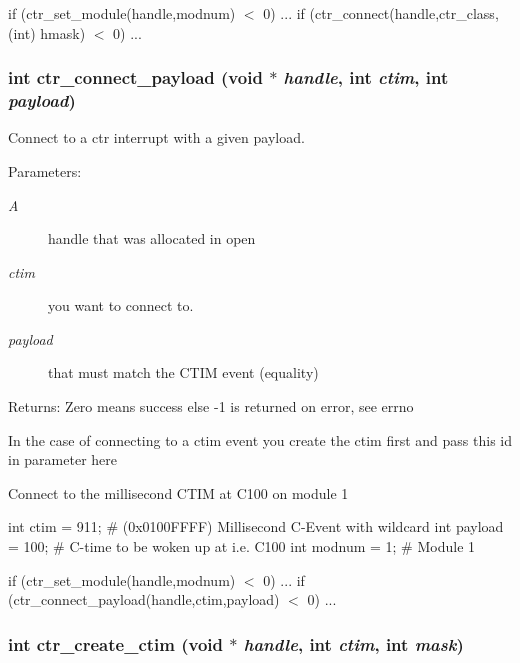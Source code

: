if (ctr\_\-set\_\-module(handle,modnum) $<$ 0) ... if (ctr\_\-connect(handle,ctr\_\-class,(int) hmask) $<$ 0) ... 
\subsubsection{\setlength{\rightskip}{0pt plus 5cm}int ctr\_\-connect\_\-payload (void $\ast$ {\em handle}, int {\em ctim}, int {\em payload})}\label{libctr_8doxygen_b11720b007c8cfd832a098c23f6c9fea}


Connect to a ctr interrupt with a given payload. 

\begin{Desc}
\item[Parameters:]
\begin{description}
\item[{\em A}]handle that was allocated in open \item[{\em ctim}]you want to connect to. \item[{\em payload}]that must match the CTIM event (equality) \end{description}
\end{Desc}
\begin{Desc}
\item[Returns:]Zero means success else -1 is returned on error, see errno\end{Desc}
In the case of connecting to a ctim event you create the ctim first and pass this id in parameter here

Connect to the millisecond CTIM at C100 on module 1

int ctim = 911; \# (0x0100FFFF) Millisecond C-Event with wildcard int payload = 100; \# C-time to be woken up at i.e. C100 int modnum = 1; \# Module 1

if (ctr\_\-set\_\-module(handle,modnum) $<$ 0) ... if (ctr\_\-connect\_\-payload(handle,ctim,payload) $<$ 0) ... 
\subsubsection{\setlength{\rightskip}{0pt plus 5cm}int ctr\_\-create\_\-ctim (void $\ast$ {\em handle}, int {\em ctim}, int {\em mask})}\label{libctr_8doxygen_79ebbc8362308a05793b2dc87fa9c288}



